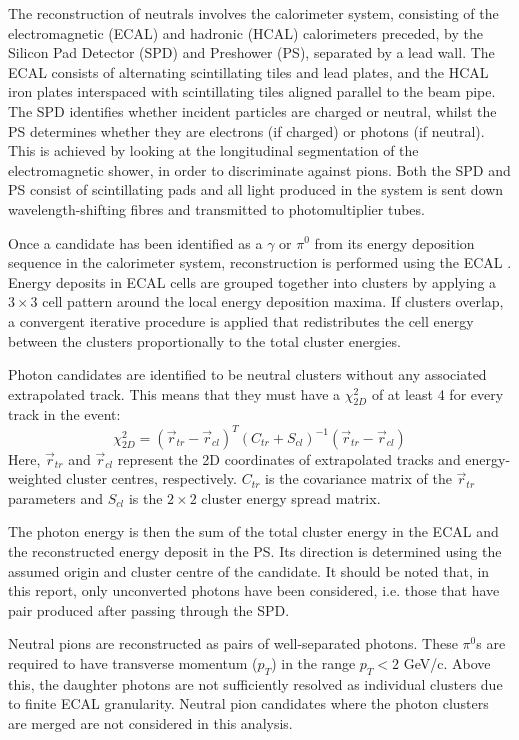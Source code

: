 \documentclass[oneside,12pt]{article}
\begin{document}
The reconstruction of neutrals involves the calorimeter system, consisting of
the electromagnetic (ECAL) and hadronic (HCAL) calorimeters preceded, by the
Silicon Pad Detector (SPD) and Preshower (PS), separated by a lead wall. The
ECAL consists of alternating scintillating tiles and lead plates, and the HCAL
iron plates interspaced with scintillating tiles aligned parallel to the beam
pipe. The SPD identifies whether incident particles are charged or neutral,
whilst the PS determines whether they are electrons (if charged) or photons (if
neutral). This is achieved by looking at the longitudinal segmentation of the
electromagnetic shower, in order to discriminate against pions. Both the SPD and
PS consist of scintillating pads and all light produced in the system is sent
down wavelength-shifting fibres and transmitted to photomultiplier tubes.

Once a candidate has been identified as a $\gamma$ or $\pi^0$ from its energy
deposition sequence in the calorimeter system, reconstruction is performed using
the ECAL \cite{NeutralReconstruction}. Energy deposits in ECAL cells are grouped
together into clusters by applying a $3\times3$ cell pattern around the local
energy deposition maxima. If clusters overlap, a convergent iterative procedure
is applied that redistributes the cell energy between the clusters
proportionally to the total cluster energies.

Photon candidates are identified to be neutral clusters without any associated
extrapolated track. This means that they must have a $\chi^2_{2D}$ of at least 4
for every track in the event:
\begin{equation}
  \chi^2_{2D}=(\vec{r}_{tr}-\vec{r}_{cl})^T(C_{tr}+S_{cl})^{-1}(\vec{r}_{tr}-\vec{r}_{cl})
  \label{Chi2}
\end{equation}
\noindent Here, $\vec{r}_{tr}$ and $\vec{r}_{cl}$ represent the 2D coordinates
of extrapolated tracks and energy-weighted cluster centres, respectively.
$C_{tr}$ is the covariance matrix of the $\vec{r}_{tr}$ parameters and $S_{cl}$
is the $2 \times 2$ cluster energy spread matrix.  

The photon energy is then the sum of the total cluster energy in the ECAL and
the reconstructed energy deposit in the PS. Its direction is determined using
the assumed origin and cluster centre of the candidate. It should be noted that,
in this report, only unconverted photons have been considered, i.e. those that
have pair produced after passing through the SPD.

Neutral pions are reconstructed as pairs of well-separated photons. These
$\pi^0$s are required to have transverse momentum ($p_T$) in the range $p_{T}<2$
GeV/c.  Above this, the daughter photons are not sufficiently resolved as
individual clusters due to finite ECAL granularity. Neutral pion candidates
where the photon clusters are merged are not considered in this analysis.
\end{document}
